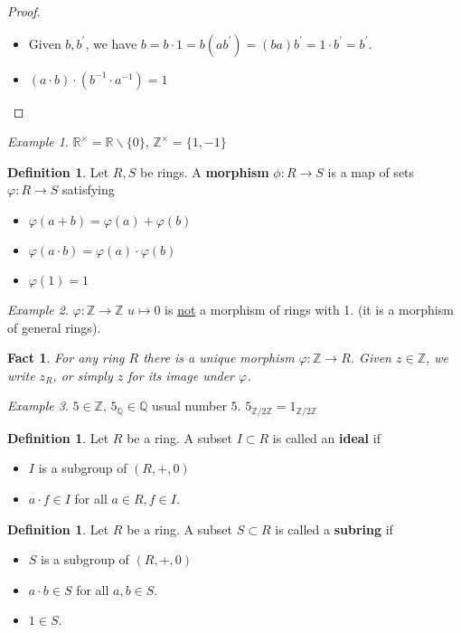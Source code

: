 \documentclass{amsart}
\newcommand{\RR}{\mathbb{R}}
\newcommand{\QQ}{\mathbb{Q}}
\newcommand{\ZZ}{\mathbb{Z}}
\newcommand{\Zn}[1]{\mathbb{Z} / #1 \mathbb{Z}}
\newtheorem{fact}[thm]{Fact}
\theoremstyle{definition}
\newtheorem{defn}[thm]{Definition}
\theoremstyle{remark}
\newtheorem*{ex}{Example}
\begin{document}
\begin{proof} \hspace{0.5cm}
    \begin{itemize}
        \item Given $b, b^\prime$, we have $b = b \cdot 1 = b(ab^\prime) = (ba)b^\prime = 1 \cdot b^\prime
         = b^\prime$.
         \item $(a \cdot b) \cdot (b^{-1} \cdot a^{-1}) = 1$
    \end{itemize}
\end{proof}
\begin{ex}
    $\RR^\times = \RR \backslash \{0\}$, $\ZZ^\times = \{1, -1\}$
\end{ex}
\begin{defn}
    Let $R, S$ be rings. A \textbf{morphism} $\phi:R \rightarrow S$ is a map of
    sets $\varphi:R \rightarrow S$ satisfying
    \begin{itemize}
        \item $\varphi(a + b) = \varphi(a) + \varphi(b)$
        \item $\varphi(a \cdot b) = \varphi(a) \cdot \varphi(b)$
        \item $\varphi(1) = 1$
    \end{itemize}
\end{defn}
\begin{ex}
    $\varphi:\ZZ \rightarrow \ZZ$ $u \mapsto 0$ is \underline{not} a morphism of
    rings with 1. (it is a morphism of general rings).
\end{ex}
\begin{fact}\label{fact:!morph}
    For any ring $R$ there is a unique morphism $\varphi:\ZZ \rightarrow R$. Given
    $z \in \ZZ$, we write $z_{R}$, or simply $z$ for its image under $\varphi$.
\end{fact}
\begin{ex}
    $5 \in \ZZ$, $5_{\QQ} \in \QQ$ usual number $5$. $5_{\Zn 2} = 1_{\Zn 2}$
\end{ex}
\begin{defn}
    Let $R$ be a ring. A subset $I \subset R$ is called an \textbf{ideal} if
    \begin{itemize}
        \item $I$ is a subgroup of $(R, +, 0)$
        \item $a \cdot f \in I$ for all $a \in R, f \in I$.
    \end{itemize}
\end{defn}
\begin{defn}
    Let $R$ be a ring. A subset $S \subset R$ is called a \textbf{subring} if
    \begin{itemize}
        \item $S$ is a subgroup of $(R, +, 0)$
        \item $a \cdot b \in S$ for all $a, b \in S$.
        \item $1 \in S$.
    \end{itemize}
\end{defn}
\end{document}
